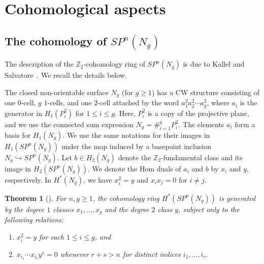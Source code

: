 \documentclass[amscd,amssymb,verbatim,10pt]{amsart}
\numberwithin{equation}{section}
\theoremstyle{plain}
\newtheorem{thm}{Theorem}[section]
\newtheorem{proposition}[thm]{Proposition}
\theoremstyle{definition}
\DeclareMathOperator{\zcl}{{\mathsf{zcl}}}
\def\Z{{\mathbb Z}}
\newcommand{\vgeq}{\mathrel{\rotatebox{90}{$\geq$}}}
\begin{document}

\section{Cohomological aspects}\label{sec: cohomo}


\subsection{The cohomology of $SP^n(N_g)$}\label{subsec: coho ring}

The description of the $\Z_2$-cohomology ring of $SP^n(N_g)$ is due to Kallel and Salvatore~\cite{KS}. We recall the details below.

The closed non-orientable surface $N_g$ (for $g\ge 1$) has a CW  structure consisting of one $0$-cell, $g$ $1$-cells, and one $2$-cell attached by the word $a_1^2a_2^2\cdots a_g^2$, where $a_i$ is the generator in $H_1(P_i^2)$ for $1\le i \le g$. Here, $P_i^2$ is a copy of the projective plane, and we use the connected sum expression $N_g=\#_{i=1}^gP_i^2$. The elements $a_i$ form a basis for $H_1(N_g)$. We use the same notations for their images in $H_1(SP^n(N_g))$ under the map induced by a basepoint inclusion $N_g \hookrightarrow SP^n(N_g)$. Let $b\in H_2(N_g)$ denote the $\Z_2$-fundamental class and its image in $H_2(SP^n(N_g))$. We denote the Hom duals of $a_i$ and $b$ by $x_i$ and $y$, respectively. In $H^*(N_g)$, we have $x_i^2=y$ and $x_ix_j=0$ for $i\ne j$.

\begin{thm}[]\label{thm: ks description}
For $n,g\ge 1$, the cohomology ring $H^*(SP^n(N_g))$ is generated by the degree $1$ classes $x_1,\ldots,x_g$ and the degree $2$ class $y$, subject only to the following relations:
\begin{enumerate}
\item $x_i^2=y$ for each $1\le i\le g$, and
\item $x_{i_1}\cdots x_{i_r}y^s=0$ whenever $r+s > n$ for distinct indices $i_1,\ldots,i_r$.
\end{enumerate}
\end{thm}
\end{document}
